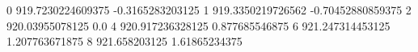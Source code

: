 0 919.7230224609375 -0.3165283203125
1 919.3350219726562 -0.70452880859375
2 920.03955078125 0.0
4 920.917236328125 0.877685546875
6 921.247314453125 1.207763671875
8 921.658203125 1.61865234375
